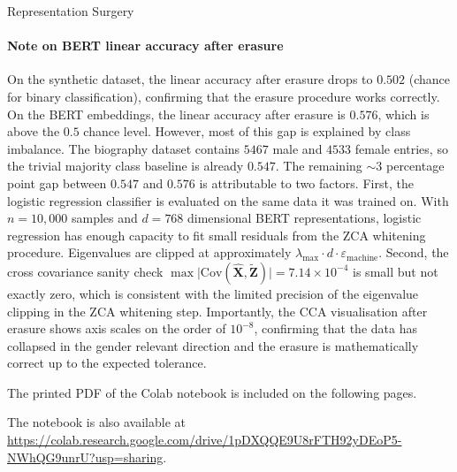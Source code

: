\begin{question}{Representation Surgery}
\begin{subquestion}
\paragraph{Note on BERT linear accuracy after erasure}
On the synthetic dataset, the linear accuracy after erasure drops to $0.502$ (chance for binary classification), confirming that the erasure procedure works correctly.
On the BERT embeddings, the linear accuracy after erasure is $0.576$, which is above the $0.5$ chance level.
However, most of this gap is explained by class imbalance. 
The biography dataset contains $5467$ male and $4533$ female entries, so the trivial majority class baseline is already $0.547$.
The remaining ${\sim}3$ percentage point gap between $0.547$ and $0.576$ is attributable to two factors.
First, the logistic regression classifier is evaluated on the same data it was trained on.
With $n = 10{,}000$ samples and $d = 768$ dimensional BERT representations, logistic regression has enough capacity to fit small residuals from the ZCA whitening procedure. 
Eigenvalues are clipped at approximately $\lambda_{\max} \cdot d \cdot \varepsilon_{\text{machine}}$.
Second, the cross covariance sanity check $\max\lvert\mathrm{Cov}(\hat{\mathbf{X}}, \widetilde{\mathbf{Z}})\rvert = 7.14 \times 10^{-4}$ is small but not exactly zero, which is consistent with the limited precision of the eigenvalue clipping in the ZCA whitening step.
Importantly, the CCA visualisation after erasure shows axis scales on the order of $10^{-8}$, confirming that the data has collapsed in the gender relevant direction and the erasure is mathematically correct up to the expected tolerance.

The printed PDF of the Colab notebook is included on the following pages.

The notebook is also available at \url{https://colab.research.google.com/drive/1pDXQQE9U8rFTH92yDEoP5-NWhQG9unrU?usp=sharing}.



\end{subquestion}

\end{question}